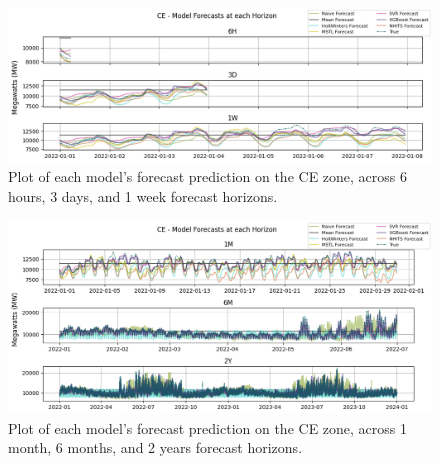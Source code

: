 \documentclass[sigconf]{acmart}
\begin{document}
  \begin{figure}[hbt!]
    \includegraphics[width=\textwidth]{Images/Result_Plot_1.png}
    \caption{Plot of each model's forecast prediction on the CE zone, across 6 hours, 3 days, and 1 week forecast horizons.}
    \Description{}
    \label{fig:resultsplot2}
  \end{figure}
  
    \begin{figure}[hbt!]
    \includegraphics[width=\textwidth]{Images/Result_Plot_2.png}
    \caption{Plot of each model's forecast prediction on the CE zone, across 1 month, 6 months, and 2 years forecast horizons.}
    \Description{}
    \label{fig:resultsplot1}
  \end{figure}
  
\end{document}

